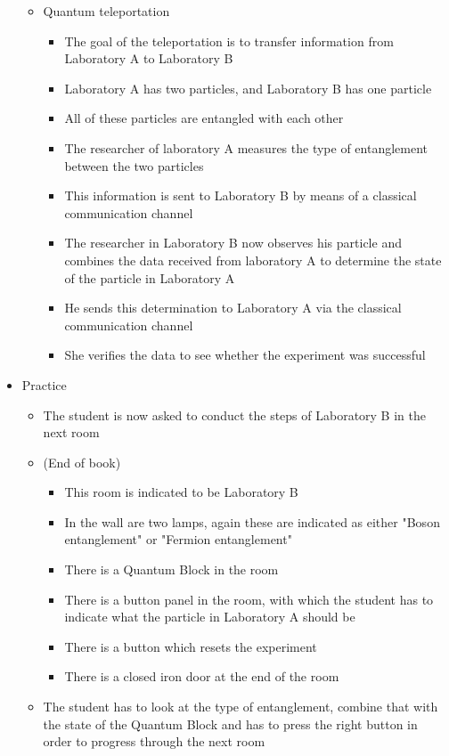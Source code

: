 \documentclass[11pt,twoside]{report} %
\begin{document}
\begin{itemize}
\begin{itemize}
\begin{itemize}
		\end{itemize}
		\item Quantum teleportation
		\begin{itemize}
			\item The goal of the teleportation is to transfer information from Laboratory A to Laboratory B
			\item Laboratory A has two particles, and Laboratory B has one particle
			\item All of these particles are entangled with each other
			\item The researcher of laboratory A measures the type of entanglement between the two particles
			\item This information is sent to Laboratory B by means of a classical communication channel
			\item The researcher in Laboratory B now observes his particle and combines the data received from laboratory A to determine the state of the particle in Laboratory A
			\item He sends this determination to Laboratory A via the classical communication channel
			\item She verifies the data to see whether the experiment was successful
		\end{itemize}
	\end{itemize}
	\item Practice
	\begin{itemize}
		\item The student is now asked to conduct the steps of Laboratory B in the next room
		\item (End of book)
		\begin{itemize}
			\item This room is indicated to be Laboratory B
			\item In the wall are two lamps, again these are indicated as either "Boson entanglement" or "Fermion entanglement"
			\item There is a Quantum Block in the room
			\item There is a button panel in the room, with which the student has to indicate what the particle in Laboratory A should be
			\item There is a button which resets the experiment
			\item There is a closed iron door at the end of the room
		\end{itemize}
		\item The student has to look at the type of entanglement, combine that with the state of the Quantum Block and has to press the right button in order to progress through the next room

\end{itemize}
\end{itemize}
\end{document}
